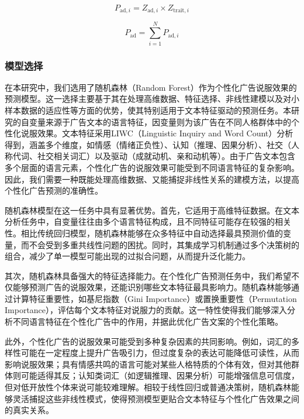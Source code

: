 \begin{equation}
    P_{\text{ad},i} = Z_{\text{ad},i} \times Z_{\text{trait},i}
    \label{eq:persuasion_effect}
\end{equation}

\begin{equation}
    P_{\text{ad}} = \sum_{i=1}^{N} P_{\text{ad},i}
    \label{eq:persuasion_index}
\end{equation}


\subsubsection{模型选择}
在本研究中，我们选用了随机森林（Random Forest）作为个性化广告说服效果的预测模型。这一选择主要基于其在处理高维数据、特征选择、非线性建模以及对小样本数据的适应性等方面的优势，使其特别适用于文本特征驱动的预测任务。本研究的自变量来源于广告文本的语言特征，因变量则为该广告在不同人格群体中的个性化说服效果。文本特征采用LIWC（Linguistic Inquiry and Word Count）分析得到，涵盖多个维度，如情感（情绪正负性）、认知（推理、因果分析）、社交（人称代词、社交相关词汇）以及驱动（成就动机、亲和动机等）。由于广告文本包含多个层面的语言元素，个性化广告的说服效果可能受到不同语言特征的复杂影响。因此，我们需要一种既能处理高维数据、又能捕捉非线性关系的建模方法，以提高个性化广告预测的准确性。

随机森林模型在这一任务中具有显著优势。首先，它适用于高维特征数据。在文本分析任务中，自变量往往由多个语言特征构成，且不同特征可能存在较强的相关性。相比传统回归模型，随机森林能够在众多特征中自动选择最具预测价值的变量，而不会受到多重共线性问题的困扰。同时，其集成学习机制通过多个决策树的组合，减少了单一模型可能出现的过拟合问题，从而提升泛化能力。

其次，随机森林具备强大的特征选择能力。在个性化广告预测任务中，我们希望不仅能够预测广告的说服效果，还能识别哪些文本特征最具影响力。随机森林能够通过计算特征重要性，如基尼指数（Gini Importance）或置换重要性（Permutation Importance），评估每个文本特征对说服力的贡献。这一特性使得我们能够深入分析不同语言特征在个性化广告中的作用，并据此优化广告文案的个性化策略。

此外，个性化广告的说服效果可能受到多种复杂因素的共同影响。例如，词汇的多样性可能在一定程度上提升广告吸引力，但过度复杂的表达可能降低可读性，从而影响说服效果；具有情感共鸣的语言可能对某些人格特质的个体有效，但对其他群体则可能适得其反；认知类词汇（如逻辑推理、因果分析）可能增强信息可信度，但对低开放性个体来说可能较难理解。相较于线性回归或普通决策树，随机森林能够灵活捕捉这些非线性模式，使得预测模型更贴合文本特征与个性化广告效果之间的真实关系。

